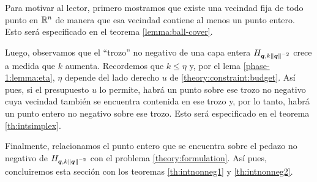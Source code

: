 Para motivar al lector, primero mostramos que existe una vecindad fija de todo punto en $\mathbb{R}^n$ de
manera que esa vecindad contiene al menos un punto entero. Esto será especificado en el teorema
\ref{lemma:ball-cover}.

Luego, observamos que el ``trozo'' no negativo de una capa entera $H_{\boldsymbol{q},
k\left\lVert \boldsymbol{q} \right\rVert^{-2}}$ crece a medida que $k$ aumenta. Recordemos que $k \leq
\eta$ y, por el lema \ref{phase-1:lemma:eta}, $\eta$ depende del lado derecho
$u$ de \eqref{theory:constraint:budget}. Así pues, si el presupuesto $u$ lo
permite, habrá un punto sobre ese trozo no negativo cuya vecindad también se
encuentra contenida en ese trozo y, por lo tanto, habrá un punto entero no
negativo sobre ese trozo. Esto será especificado en el teorema
\ref{th:intsimplex}.

Finalmente, relacionamos el punto entero que se encuentra sobre el pedazo no negativo de
$H_{\boldsymbol{q}, k\left\lVert \boldsymbol{q} \right\rVert^{-2}}$ con el problema \eqref{theory:formulation}. Así pues, concluiremos
esta sección con los teoremas \ref{th:intnonneg1} y \ref{th:intnonneg2}.

